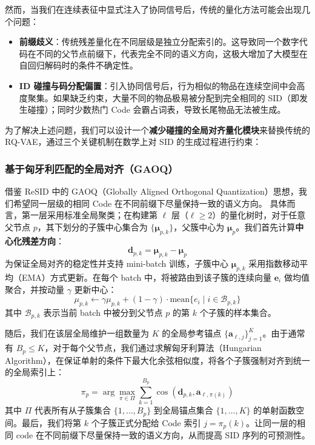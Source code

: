\documentclass[11pt]{article}
\begin{document}
然而，当我们在连续表征中显式注入了协同信号后，传统的量化方法可能会出现几个问题：
\begin{itemize}
    \item \textbf{前缀歧义}：传统残差量化在不同层级是独立分配索引的。这导致同一个数字代码在不同的父节点前缀下，代表完全不同的语义方向，这极大增加了大模型在自回归解码时的条件不确定性。
    \item \textbf{ID 碰撞与码分配偏置}：引入协同信号后，行为相似的物品在连续空间中会高度聚集。如果缺乏约束，大量不同的物品极易被分配到完全相同的 SID（即发生碰撞）；同时少数热门 Code 会霸占词表，导致长尾物品无法被生成。
\end{itemize}

为了解决上述问题，我们可以设计一个\textbf{减少碰撞的全局对齐量化模块}来替换传统的RQ-VAE，通过三个关键机制在数学上对 SID 的生成过程进行约束：

\subsubsection{基于匈牙利匹配的全局对齐（GAOQ）}
借鉴 ReSID \cite{liang2026resid} 中的 GAOQ（Globally Aligned Orthogonal Quantization）思想，我们希望同一层级的相同 Code 在不同前缀下尽量保持一致的语义方向。
具体而言，第一层采用标准全局聚类；在构建第 $\ell$ 层（$\ell \ge 2$）的量化树时，对于任意父节点 $p$，其下划分的子簇中心集合为 $\{\boldsymbol{\mu}_{p,k}\}$，父簇中心为 $\boldsymbol{\mu}_p$。我们首先计算\textbf{中心化残差方向}：
$$ \mathbf{d}_{p,k} = \boldsymbol{\mu}_{p,k} - \boldsymbol{\mu}_p $$
为保证全局对齐的稳定性并支持 mini-batch 训练，子簇中心 $\boldsymbol{\mu}_{p,k}$ 采用指数移动平均（EMA）方式更新。在每个 batch 中，将被路由到该子簇的连续向量 $\mathbf{e}_i$ 做均值聚合，并按动量 $\gamma$ 更新中心：
$$\mu_{p,k} \leftarrow \gamma\mu_{p,k} + (1 - \gamma) \cdot \text{mean}\{e_i \mid i \in \mathcal{B}_{p,k}\}$$
其中 $\mathcal{B}_{p,k}$ 表示当前 batch 中被分到父节点 $p$ 的第 $k$ 个子簇的样本集合。

随后，我们在该层全局维护一组数量为 $K$ 的全局参考锚点 $\{\mathbf{a}_{\ell,j}\}_{j=1}^K$。由于通常有 $B_p \le K$，对于每个父节点，我们通过求解匈牙利算法（Hungarian Algorithm），在保证单射的条件下最大化余弦相似度，将各个子簇强制对齐到统一的全局索引上：
$$ \pi_p = \arg\max_{\pi \in \Pi} \sum_{k=1}^{B_p} \cos(\mathbf{d}_{p,k}, \mathbf{a}_{\ell,\pi(k)}) $$
其中 $\Pi$ 代表所有从子簇集合 $\{1, \dots, B_p\}$ 到全局锚点集合 $\{1, \dots, K\}$ 的单射函数空间。最后，我们将第 $k$ 个子簇正式分配给 Code 索引 $j = \pi_p(k)$。让同一层的相同 code 在不同前缀下尽量保持一致的语义方向，从而提高 SID 序列的可预测性。
\end{document}
